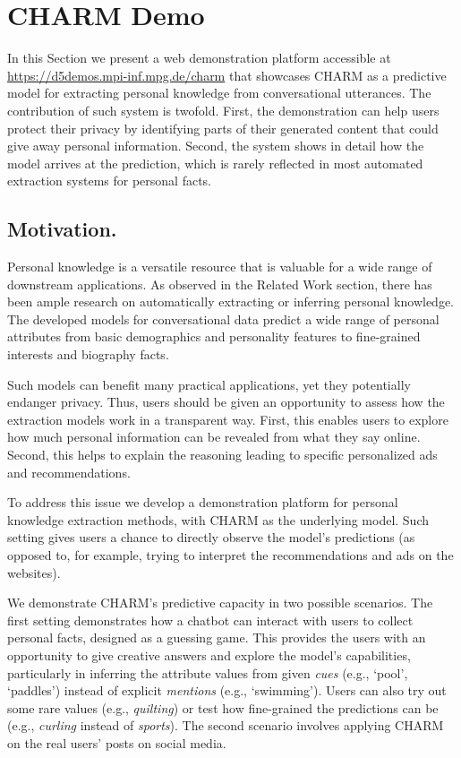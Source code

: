 \section{CHARM Demo}

In this Section we present a web demonstration platform accessible at \url{https://d5demos.mpi-inf.mpg.de/charm} that showcases CHARM as a predictive model for extracting personal knowledge from conversational utterances. The contribution of such system is twofold. First, the demonstration can help users protect their privacy by identifying parts of their generated content that could give away personal information. Second, the system shows in detail how the model arrives at the prediction, which is rarely 
reflected in most automated extraction systems for personal facts.

\subsection{Motivation.} 

Personal knowledge is a versatile resource that is valuable for a wide range of downstream applications. As observed in the Related Work section, there has been ample research on automatically extracting or inferring personal knowledge. The developed models for conversational data predict a wide range of personal attributes from basic demographics and personality features to fine-grained interests and biography facts.

Such models can benefit many practical applications, yet they potentially endanger privacy. Thus, users should be given an opportunity to assess how the extraction models work in a transparent way. First, this enables users to explore how much personal information can be revealed from what they say online. Second, this helps to explain the reasoning leading to specific personalized ads and recommendations.

To address this issue we develop a demonstration platform for personal knowledge extraction methods, with CHARM as the underlying model. Such setting gives users a chance to directly observe the model's predictions (as opposed to, for example, trying to interpret the recommendations and ads on the websites).

We demonstrate CHARM's predictive capacity in two possible scenarios. The first setting demonstrates how a chatbot can interact with users to collect personal facts, designed as a guessing game. 
This provides the users with an opportunity to give creative answers and explore the model's capabilities, particularly in inferring the attribute values from given \emph{cues} (e.g., `pool', `paddles') instead of explicit \emph{mentions} (e.g., `swimming'). 
Users can also try out some rare values (e.g., \emph{quilting}) or test how fine-grained the predictions can be (e.g., \emph{curling} instead of \emph{sports}). 
The second scenario involves applying CHARM on the real users' posts on social media. 


